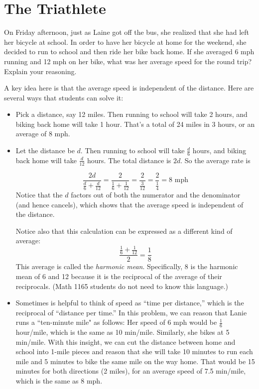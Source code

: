 \newpage
\section{The Triathlete}\label{A:Triathlete}

\begin{prob} 
On Friday afternoon, just as Laine got off the bus, she realized that she had left her bicycle at school.  In order to have her bicycle at home for the weekend, she decided to run to school and then ride her bike back home.  If she averaged 6 mph running and 12 mph on her bike, what was her average speed for the round trip?  Explain your reasoning. 
\end{prob}

\begin{teachingnote}
A key idea here is that the average speed is independent of the distance.  Here are several ways that students can solve it: 
\begin{itemize}
\item Pick a distance, say 12 miles.  Then running to school will take 2 hours, and biking back home will take 1 hour.  That's a total of 24 miles in 3 hours, or an average of 8 mph.  
\item Let the distance be $d$.  Then running to school will take $\frac{d}{6}$ hours, and biking back home will take $\frac{d}{12}$ hours.  The total distance is $2d$.  So the average rate is 

$$\frac{2d}{\frac{d}{6}+\frac{d}{12}}=\frac{2}{\frac{1}{6}+\frac{1}{12}}=\frac{2}{\frac{3}{12}}=\frac{2}{\frac{1}{4}}=8 \text{ mph}$$
Notice that the $d$ factors out of both the numerator and the denominator (and hence cancels), which shows that the average speed is independent of the distance.  

Notice also that this calculation can be expressed as a different kind of average:  $$\frac{\frac{1}{6}+\frac{1}{12}}{2}=\frac{1}{8}$$
This average is called the \emph{harmonic mean}.  Specifically, 8 is the harmonic mean of 6 and 12 because it is the reciprocal of the average of their reciprocals.  (Math 1165 students do not need to know this language.)
\item Sometimes is helpful to think of speed as ``time per distance,'' which is the reciprocal of ``distance per time.''  In this problem, we can reason that Lanie runs a ``ten-minute mile" as follows:  Her speed of 6 mph would be $\frac{1}{6}$ hour/mile, which is the same as 10 min/mile.  Similarly, she bikes at 5 min/mile.  With this insight, we can cut the distance between home and school into 1-mile pieces and reason that she will take 10 minutes to run each mile and 5 minutes to bike the same mile on the way home.  That would be 15 minutes for both directions (2 miles), for an average speed of 7.5 min/mile, which is the same as 8 mph.  
\end{itemize}
\end{teachingnote}

